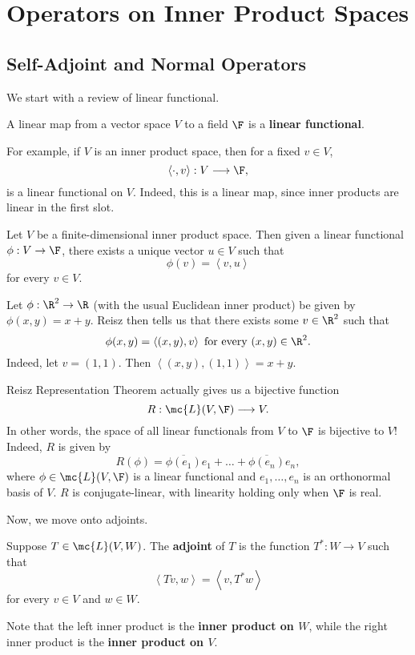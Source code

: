 \documentclass[math0540-lecture-notes.tex]{subfiles}
\begin{document}
\chapter{Operators on Inner Product Spaces}

\section{Self-Adjoint and Normal Operators}

We start with a review of linear functional.

\begin{definition}{}
  A linear map from a vector space $V$ to a field $\F$ is a \textbf{linear functional}.
\end{definition}
For example, if $V$ is an inner product space, then for a fixed $v\in V$, \[
  \left<\cdot , v \right> :V\longrightarrow \F
,\] is a linear functional on $V$. Indeed, this is a linear map, since inner products are linear in
the first slot.

\begin{theorem}{}
  Let $V$ be a finite-dimensional inner product space. Then given a linear functional $\phi:V\to
  \F$, there exists a unique vector $u\in V$ such that \[
    \phi(v)=\left<v,u \right> 
  \] for every $v\in V$.
\end{theorem}

\begin{example}
  Let $\phi:\R^2\to \R$ (with the usual Euclidean inner product) be given by $\phi(x,y)=x+y$. Reisz
  then tells us that there exists some $v\in \R^2$ such that \[
    \phi(x,y)=\left<(x,y),v \right> ~\text{for every}~(x,y)\in \R^2
  .\] Indeed, let $v=(1,1)$. Then $\left<(x,y),(1,1) \right> =x+y$.
\end{example}

Reisz Representation Theorem actually gives us a bijective function \[
  R:\mc{L}(V,\F)\longrightarrow V
.\] In other words, the space of all linear functionals from $V$ to $\F$ is bijective to $V$!
Indeed, $R$ is given by \[
  R(\phi)=\overline{\phi(e_1)}e_1+\ldots+\overline{\phi(e_n)}e_n  
,\] where $\phi\in \mc{L}(V,\F)$ is a linear functional and $e_1,\ldots,e_n$ is an orthonormal basis
of $V$. $R$ is conjugate-linear, with linearity holding only when $\F$ is real.

Now, we move onto adjoints.
\begin{definition}[Adjoint, $T^*$]{}
  Suppose $T\in \mc{L}(V,W)$. The \textbf{adjoint} of $T$ is the function $T^*:W\to V$ such that \[
    \left<Tv,w \right> =\left<v,T^*w \right> 
  \] for every $v\in V$ and $w\in W$.

  Note that the left inner product is the \textbf{inner product on $W$}, while the right inner
  product is the \textbf{inner product on $V$}.
\end{definition}
\end{document}
